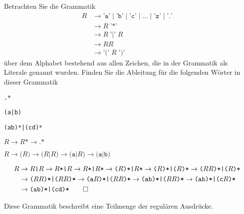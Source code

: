 Betrachten Sie die Grammatik 
\begin{align*}
R&\to \texttt{'a'} \mid  \texttt{'b'} \mid  \texttt{'c'} \mid \dots\mid  \texttt{'z'} \mid  \texttt{'.'}\\
 &\to R\; \texttt{'*'}\\
 &\to R\; \texttt{'|'}\; R\\
 &\to RR\\
 &\to \texttt{'('} \; R \; \texttt{')'}
\end{align*}
über dem Alphabet bestehend aus allen Zeichen, die in der Grammatik als
Literale genannt wurden.
Finden Sie die Ableitung für die folgenden Wörter in dieser Grammatik
\begin{teilaufgaben}
\item \texttt{.*}
\item \texttt{(a|b)}
\item \texttt{(ab)*|(cd)*}
\end{teilaufgaben}


\begin{loesung}
\begin{teilaufgaben}
\item
\(
R\to R\texttt{*}\to \texttt{.*}
\)
\item \(
R\to \texttt{(} R\texttt{)}
  \to \texttt{(}R\texttt{|}R\texttt{)}
  \to \texttt{(a|}R\texttt{)}
  \to \texttt{(a|b)}
\)
\item
\begin{align*}
R&\to R\texttt{|}R
  \to R\texttt{*|}R
  \to R\texttt{*|}R\texttt{*}
  \to \texttt{(}R\texttt{)*|}R\texttt{*}
  \to \texttt{(}R\texttt{)*|(}R\texttt{)*}
  \to \texttt{(}RR\texttt{)*|(}R\texttt{)*}
\\
 &\to \texttt{(}RR\texttt{)*|(}RR\texttt{)*}
  \to \texttt{(a}R\texttt{)*|(}RR\texttt{)*}
  \to \texttt{(ab)*|(}RR\texttt{)*}
  \to \texttt{(ab)*|(c}R\texttt{)*}
\\
 &\to \texttt{(ab)*|(cd)*}
\qedhere
\end{align*}
\end{teilaufgaben}
\end{loesung}

\begin{diskussion}
Diese Grammatik beschreibt eine Teilmenge der regulären Ausdrücke.
\end{diskussion}


